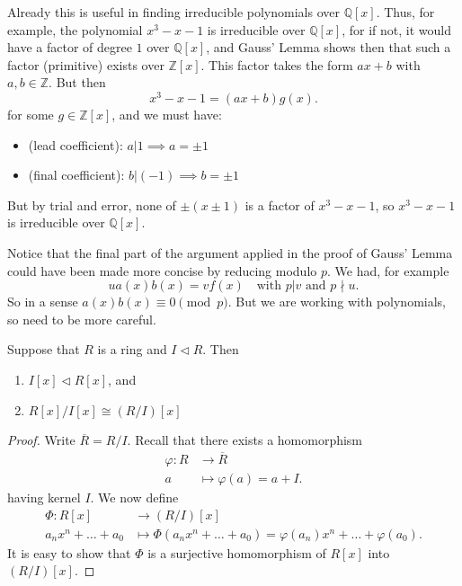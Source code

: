 \begin{example}
Already this is useful in finding irreducible polynomials over $\mathbb{Q}[x]$. Thus, for example, the polynomial $x^3 - x - 1$ is irreducible over $\mathbb{Q}[x]$, for if not, it would have a factor of degree $1 $ over $\mathbb{Q}[x]$, and Gauss' Lemma shows then that such a factor (primitive) exists over $\mathbb{Z}[x]$. This factor takes the form $ax+b$ with $a,b \in \mathbb{Z}$. But then
\[
	x^3 - x - 1 = (ax+b) g(x)
.\] 
for some $g \in \mathbb{Z}[x]$, and we must have:
\begin{itemize}
	\item (lead coefficient): $a | 1 \implies a = \pm 1$
	\item (final coefficient): $b | (-1) \implies b = \pm 1$
\end{itemize}
But by trial and error, none of $ \pm (x \pm 1)$ is a factor of $x^3 - x - 1$, so $x^3 - x - 1$ is irreducible over $\mathbb{Q}[x]$.
\end{example}

Notice that the final part of the argument applied in the proof of Gauss' Lemma could have been made more concise by reducing modulo $p$. We had, for example
\[
	u a(x) b(x) = v f(x) \quad \text{with }p|v \text{ and } p \nmid u
.\] 
So in a sense $a(x) b(x) \equiv 0 \pmod p$. But we are working with polynomials, so need to be more careful.

\begin{lemma}
	Suppose that $R$ is a ring and $I \triangleleft R$. Then 
	\begin{enumerate}
		\item $I[x] \triangleleft R[x]$, and
		\item $R[x] / I[x] \cong \left( R / I \right) [x]$
	\end{enumerate}
\end{lemma}
\begin{proof}
	Write $\overline{R}  = R / I$. Recall that there exists a homomorphism
	\begin{align*}
		\varphi: R &\longrightarrow \overline{R}  \\
		a &\longmapsto \varphi(a) = a+I
	.\end{align*}
	having kernel  $I$. We now define
	\begin{align*}
		\Phi: R[x] &\longrightarrow (R / I)[x] \\
		a_nx^n + \ldots + a_0 &\longmapsto \Phi(a_nx^n + \ldots + a_0) = \varphi(a_n)x^n + \ldots + \varphi(a_0)
	.\end{align*}
	It is easy to show that $\Phi$ is a surjective homomorphism of $R[x]$ into $(R / I) [x]$.
\end{proof}

